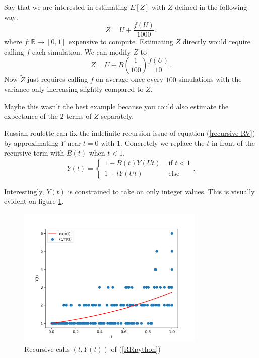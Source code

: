 \documentclass[a4paper,12pt]{article}
\begin{document}
\begin{example}
    Say that we are interested in estimating $E[Z]$ with $Z$
    defined in the following way:
    \[
        Z = U + \frac{f(U)}{1000}
        .\]
    where $f:\mathbb{R} \rightarrow [0,1]$ expensive to compute.
    Estimating $Z$ directly would require calling $f$ each
    simulation. We can modify $Z$ to
    \[
        \tilde{Z} = U + B\left(\frac{1}{100}\right)\frac{f(U)}{10}
        .\]
    Now $\tilde{Z}$
    just requires calling $f$ on average once every $100$ simulations with the variance
    only increasing slightly compared to $Z$.
\end{example}

Maybe this wasn't the best example because you could also estimate the expectance of the
$2$ terms of $Z$ separately.

\begin{example}
    Russian roulette can fix the indefinite recursion issue of
    equation (\ref{recursive RV}) by approximating $Y$ near $t = 0$ with $1$. Concretely
    we replace the $t$ in front of the recursive term with $B(t)$
    when $t<1$.
    \[
        Y(t) =
        \begin{cases}
            1 + B(t)Y(Ut) & \text{ if } t<1 \\
            1 + tY(Ut)    & \text{ else}
        \end{cases}
        .\]
\end{example}

\vspace{0.2cm}

\begin{pythonn} \label{RRpython}
    Interestingly, $Y(t)$ is constrained to take on only integer values.
    This is visually evident on figure \ref{plt russian roulette}.
    \begin{figure}[h!]
        \centering
        \includegraphics[width=0.8\textwidth]{plots/russian roulette example.png}
        \caption{Recursive calls $(t,Y(t))$ of (\ref{RRpython}) }
        \label{plt russian roulette}
    \end{figure}

\end{pythonn}
\end{document}

